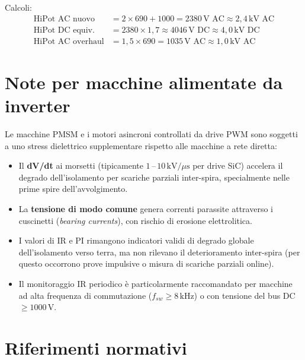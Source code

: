 \documentclass[a4paper,11pt]{article}
\begin{document}
Calcoli:
\begin{align}
  \text{HiPot AC nuovo} &= 2 \times 690 + 1000 = 2380\,\text{V AC} \approx 2{,}4\,\text{kV AC} \\
  \text{HiPot DC equiv.} &= 2380 \times 1{,}7 \approx 4046\,\text{V DC} \approx 4{,}0\,\text{kV DC} \\
  \text{HiPot AC overhaul} &= 1{,}5 \times 690 = 1035\,\text{V AC} \approx 1{,}0\,\text{kV AC}
\end{align}

\section{Note per macchine alimentate da inverter}

Le macchine PMSM e i motori asincroni controllati da drive PWM sono soggetti a uno stress dielettrico supplementare rispetto alle macchine a rete diretta:

\begin{itemize}
  \item Il \textbf{dV/dt} ai morsetti (tipicamente $1\,\text{--}\,10\,\text{kV/}\mu\text{s}$ per drive SiC) accelera il degrado dell'isolamento per scariche parziali inter-spira, specialmente nelle prime spire dell'avvolgimento.
  \item La \textbf{tensione di modo comune} genera correnti parassite attraverso i cuscinetti (\emph{bearing currents}), con rischio di erosione elettrolitica.
  \item I valori di IR e PI rimangono indicatori validi di degrado globale dell'isolamento verso terra, ma non rilevano il deterioramento inter-spira (per questo occorrono prove impulsive o misura di scariche parziali online).
  \item Il monitoraggio IR periodico è particolarmente raccomandato per macchine ad alta frequenza di commutazione ($f_{sw} \geq 8\,\text{kHz}$) o con tensione del bus DC $\geq 1000\,\text{V}$.
\end{itemize}

\section*{Riferimenti normativi}
\end{document}
